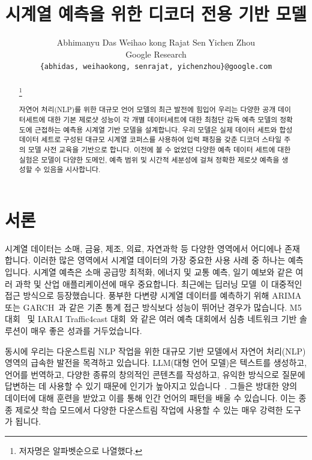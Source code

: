 \documentclass{article}
\author{ Abhimanyu Das
	\And
	Weihao kong 
    \And
    Rajat Sen
    \And
    Yichen Zhou \\
    \And
    Google Research \\
	\texttt{\{abhidas, weihaokong, senrajat, yichenzhou\}@google.com} \\
}
\title{시계열 예측을 위한 디코더 전용 기반 모델}
\newcommand\blfootnote[1]{%
  \begingroup
  \renewcommand\thefootnote{}\footnote{#1}%
  \addtocounter{footnote}{-1}%
  \endgroup
}
\begin{document}
\maketitle



\begin{abstract}
\blfootnote{저자명은 알파벳순으로 나열했다.}
자연어 처리(NLP)를 위한 대규모 언어 모델의 최근 발전에 힘입어 우리는 다양한 공개 데이터세트에 대한 기본 제로샷 성능이 각 개별 데이터세트에 대한 최첨단 감독 예측 모델의 정확도에 근접하는 예측용 시계열 기반 모델을 설계합니다. 우리 모델은 실제 데이터 세트와 합성 데이터 세트로 구성된 대규모 시계열 코퍼스를 사용하여 입력 패칭을 갖춘 디코더 스타일 주의 모델 사전 교육을 기반으로 합니다. 이전에 볼 수 없었던 다양한 예측 데이터 세트에 대한 실험은 모델이 다양한 도메인, 예측 범위 및 시간적 세분성에 걸쳐 정확한 제로샷 예측을 생성할 수 있음을 시사합니다.


\end{abstract}

\section{서론}
\label{sec:intro}

시계열 데이터는 소매, 금융, 제조, 의료, 자연과학 등 다양한 영역에서 어디에나 존재합니다. 이러한 많은 영역에서 시계열 데이터의 가장 중요한 사용 사례 중 하나는 예측입니다. 시계열 예측은 소매 공급망 최적화, 에너지 및 교통 예측, 일기 예보와 같은 여러 과학 및 산업 애플리케이션에 매우 중요합니다. 최근에는 딥러닝 모델~\citep{salinas2020deepar,oreshkin2019n}이 대중적인 접근 방식으로 등장했습니다.
풍부한 다변량 시계열 데이터를 예측하기 위해 ARIMA 또는 GARCH~\citep{box1968some}과 같은 기존 통계 접근 방식보다 성능이 뛰어난 경우가 많습니다. M5 대회~\citep{makridakis2022m5} 및 IARAI Traffic4cast 대회~\citep{pmlr-v133-kopp21a}와 같은 여러 예측 대회에서 심층 네트워크 기반 솔루션이 매우 좋은 성과를 거두었습니다.

동시에 우리는 다운스트림 NLP 작업을 위한 대규모 기반 모델에서 자연어 처리(NLP) 영역의 급속한 발전을 목격하고 있습니다. LLM(대형 언어 모델)은 텍스트를 생성하고, 언어를 번역하고, 다양한 종류의 창의적인 콘텐츠를 작성하고, 유익한 방식으로 질문에 답변하는 데 사용할 수 있기 때문에 인기가 높아지고 있습니다~\citep{radford2019language}. 그들은 방대한 양의 데이터에 대해 훈련을 받았고 이를 통해 인간 언어의 패턴을 배울 수 있습니다. 이는 종종 제로샷 학습 모드에서 다양한 다운스트림 작업에 사용할 수 있는 매우 강력한 도구가 됩니다.
\end{document}
